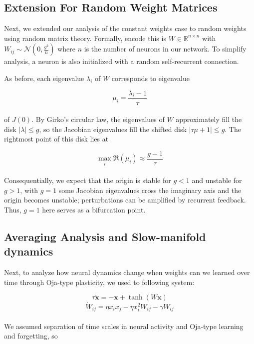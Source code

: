 \documentclass[paper=a4, fontsize=11pt]{scrartcl} %
\numberwithin{equation}{section} %
\numberwithin{figure}{section} %
\numberwithin{table}{section} %
\newcommand \bf[1]{\mathbf #1}
\begin{document}
\subsection{Extension For Random Weight Matrices}
Next, we extended our analysis of the constant weights case to random weights using random matrix theory. Formally, encode this is $W \in \mathbb{R}^{n \times n}$ with $W_{ij} \sim \mathcal{N}(0, \frac{g^2}{n})$ where $n$ is the number of neurons in our network. To simplify analysis, a neuron is also initialized with a random self-recurrent connection.

As before, each eigenvalue $\lambda_i$ of $W$ corresponds to eigenvalue

\begin{equation}
\mu_i = \frac{\lambda_i - 1}{\tau}
\end{equation}
\\

of $J(0)$. By Girko's circular law, the eigenvalues of $W$ approximately fill the disk
$|\lambda| \leq g$, so the Jacobian eigenvalues fill the shifted disk
$|\tau\mu + 1| \leq g$.  The rightmost point of this disk lies at

\begin{equation}
    \max_i \Re(\mu_i) \approx \frac{g-1}{\tau}
\end{equation}
\\
Consequentially, we expect that the origin is stable for $g < 1$ and unstable for $ g > 1$, with $g=1$ some Jacobian eigenvalues cross the imaginary axis and the origin becomes unstable; perturbations
can be amplified by recurrent feedback. Thus, $g=1$ here serves as a bifurcation point.

\subsection{Averaging Analysis and Slow-manifold dynamics}
Next, to analyze how neural dynamics change when weights can we learned over time through Oja-type plasticity, we used to following system:

\begin{equation}
    \tau \dot{\bf{x}}  = -\bf{x} +  \tanh(W {\bf x})
\end{equation}
\begin{equation}
    \dot W_{ij} = \eta x_i x_j - \eta x_i^2 W_{ij} - \gamma W_{ij}
\end{equation}
\\
We assumed separation of time scales in neural activity and Oja-type learning and forgetting, so
\end{document}
